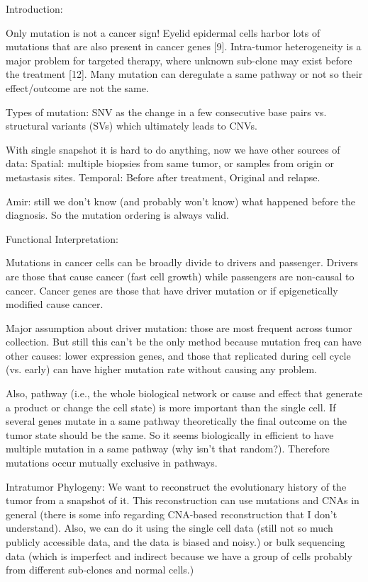 	Introduction:
	
	Only mutation is not a cancer sign! Eyelid epidermal cells harbor lots of mutations that are also present in cancer genes [9].
	Intra-tumor heterogeneity is a major problem for targeted therapy, where unknown sub-clone may exist before the treatment [12].
	Many mutation can deregulate a same pathway or not so their effect/outcome are not the same.
	
	Types of mutation: SNV as the change in a few consecutive base pairs vs. structural variants (SVs) which ultimately leads to CNVs. 
	
	With single snapshot it is hard to do anything, now we have other sources of data:
	Spatial: multiple biopsies from same tumor, or samples from origin or metastasis sites. 
	Temporal: Before after treatment, Original and relapse. 
	
	Amir: still we don't know (and probably won't know) what happened before the diagnosis. So the mutation ordering is always valid. 
	
	Functional Interpretation:
	
	Mutations in cancer cells can be broadly divide to drivers and passenger. 
	Drivers are those that cause cancer (fast cell growth) while passengers are non-causal to cancer. 
	Cancer genes are those that have driver mutation or if epigenetically modified cause cancer. 
	
	Major assumption about driver mutation: those are most frequent across tumor collection. 
	But still this can't be the only method because mutation freq can have other causes:
	lower expression genes, and those that replicated during cell cycle (vs. early) can have higher mutation rate without causing any problem. 
	
	Also, pathway (i.e., the whole biological network or cause and effect that generate a product or change the cell state) is more important than the single cell. 
	If several genes mutate in a same pathway theoretically the final outcome on the tumor state should be the same. 
	So it seems biologically in efficient to have multiple mutation in a same pathway (why isn't that random?). 
	Therefore mutations occur mutually exclusive in pathways. 
	
	Intratumor Phylogeny:
	We want to reconstruct the evolutionary history of the tumor from a snapshot of it. 
	This reconstruction can use mutations and CNAs in general (there is some info regarding CNA-based reconstruction that I don't understand). 
	Also, we can do it using the single cell data (still not so much publicly accessible data, and the data is biased and noisy.) or bulk sequencing data (which is imperfect and indirect because we have a group of cells probably from different sub-clones and normal cells.)
	
